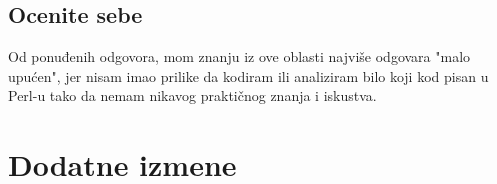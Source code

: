 \documentclass[a4paper]{report}
\begin{document}
\section{Ocenite sebe}
Od ponuđenih odgovora, mom znanju iz ove oblasti najviše odgovara "malo upućen", jer nisam imao prilike da kodiram ili analiziram bilo koji kod pisan u Perl-u tako da nemam nikavog praktičnog znanja i iskustva.


\chapter{Dodatne izmene}
\end{document}
